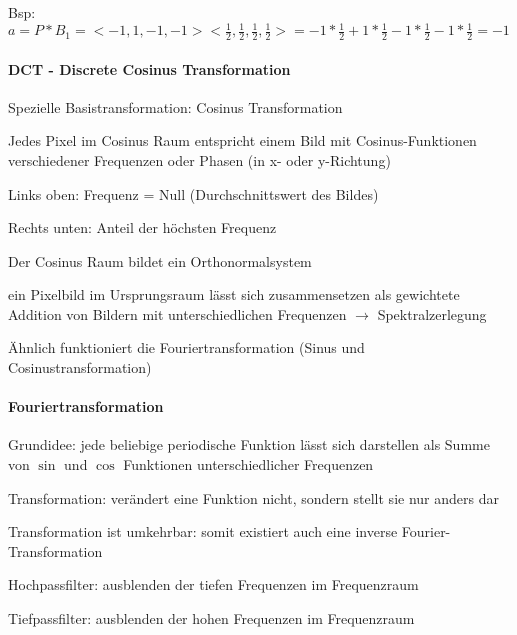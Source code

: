 \documentclass[landscape]{article}
\begin{document}
\begin{multicols}{3}
  Bsp: $a=P*B_1 = <-1, 1, -1, -1><\frac{1}{2}, \frac{1}{2}, \frac{1}{2}, \frac{1}{2}> = -1*\frac{1}{2}+1*\frac{1}{2}-1*\frac{1}{2}-1*\frac{1}{2} = -1$
  
  
  \paragraph{DCT - Discrete Cosinus Transformation}
  \begin{itemize*}
    \item Spezielle Basistransformation: Cosinus Transformation
    \item Jedes Pixel im Cosinus Raum entspricht einem Bild mit Cosinus-Funktionen verschiedener Frequenzen oder Phasen (in x- oder y-Richtung)
    \begin{itemize*}
      \item Links oben: Frequenz = Null (Durchschnittswert des Bildes)
      \item Rechts unten: Anteil der höchsten Frequenz
    \end{itemize*}
    \item Der Cosinus Raum bildet ein Orthonormalsystem
    \item ein Pixelbild im Ursprungsraum lässt sich zusammensetzen als gewichtete Addition von Bildern mit unterschiedlichen Frequenzen $\rightarrow$ Spektralzerlegung
    \item Ähnlich funktioniert die Fouriertransformation (Sinus und Cosinustransformation)
  \end{itemize*}
  
  
  \paragraph{Fouriertransformation}
  \begin{itemize*}
    \item Grundidee: jede beliebige periodische Funktion lässt sich darstellen als Summe von $\sin$ und $\cos$ Funktionen unterschiedlicher Frequenzen
    \item Transformation: verändert eine Funktion nicht, sondern stellt sie nur anders dar
    \item Transformation ist umkehrbar: somit existiert auch eine inverse Fourier-Transformation
    \item Hochpassfilter: ausblenden der tiefen Frequenzen im Frequenzraum
    \item Tiefpassfilter: ausblenden der hohen Frequenzen im Frequenzraum
  \end{itemize*}
  

\end{multicols}
\end{document}
